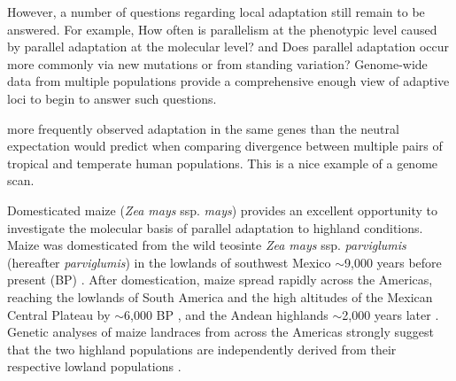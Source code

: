 %
%
However, a number of questions regarding local adaptation still remain to be answered.  For example, How often is parallelism at the phenotypic level caused by parallel adaptation at the molecular level? and Does parallel adaptation occur more commonly via new mutations or from standing variation?
Genome-wide data from multiple populations provide a comprehensive enough view of adaptive loci to begin to answer such questions.

\cite{Tennessen_2011_21698142} more frequently observed adaptation in the same genes than the neutral expectation would predict when comparing divergence between multiple pairs of tropical and temperate human populations.  This is a nice example of a genome scan. 

Domesticated maize (\emph{Zea mays} ssp. \emph{mays}) provides an excellent opportunity to investigate the molecular basis of parallel adaptation to highland conditions.  Maize was domesticated from the wild teosinte \emph{Zea mays} ssp. \emph{parviglumis} (hereafter \emph{parviglumis}) in the lowlands of southwest Mexico $\sim$9,000 years before present (BP) \cite[]{Matsuoka_2002_11983901,Piperno_2009_19307570,vanHeerwaarden_2011_21189301}. After domestication, maize spread rapidly across the Americas, reaching the lowlands of South America and the high altitudes of the Mexican Central Plateau by $\sim$6,000 BP \cite[]{Piperno_2006_69}, and the Andean highlands $\sim$2,000 years later \cite[]{Perry_2006_16511492,Grobman_2012_22307642}. Genetic analyses of maize landraces from across the Americas strongly suggest that the two highland populations are independently derived from their respective lowland populations \cite[]{Vigouroux_2008_21632329, vanHeerwaarden_2011_21189301}. 

